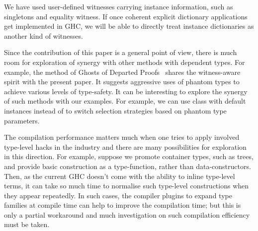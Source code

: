 \documentclass[demotion-paper.tex]{subfiles}
\begin{document}
We have used user-defined witnesses carrying instance information, such as singletons and equality witness.
If once coherent explicit dictionary applications~\cite{Winant:2018wu} get implemented in GHC, we will be able to directly treat instance dictionaries as another kind of witnesses.

Since the contribution of this paper is a general point of view, there is much room for exploration of synergy with other methods with dependent types.
For example, the method of Ghosts of Departed Proofs~\cite{Noonan:2018aa} shares the witness-aware spirit with the present paper.
It suggests aggressive uses of phantom types to achieve various levels of type-safety.
It can be interesting to explore the synergy of such methods with our examples.
For example, we can use  class with default instances instead of  to switch selection strategies based on phantom type parameters.

The compilation performance matters much when one tries to apply involved type-level hacks in the industry and there are many possibilities for exploration in this direction.
For example, suppose we promote container types, such as trees, and provide basic construction as a type-function, rather than data-constructors.
Then, as the current GHC doesn't come with the ability to inline type-level terms, it can take so much time to normalise such type-level constructions when they appear repeatedly.
In such cases, the compiler plugins to expand type families at compile time can help to improve the compilation time; but this is only a partial workaround and much investigation on such compilation efficiency must be taken.
\end{document}
